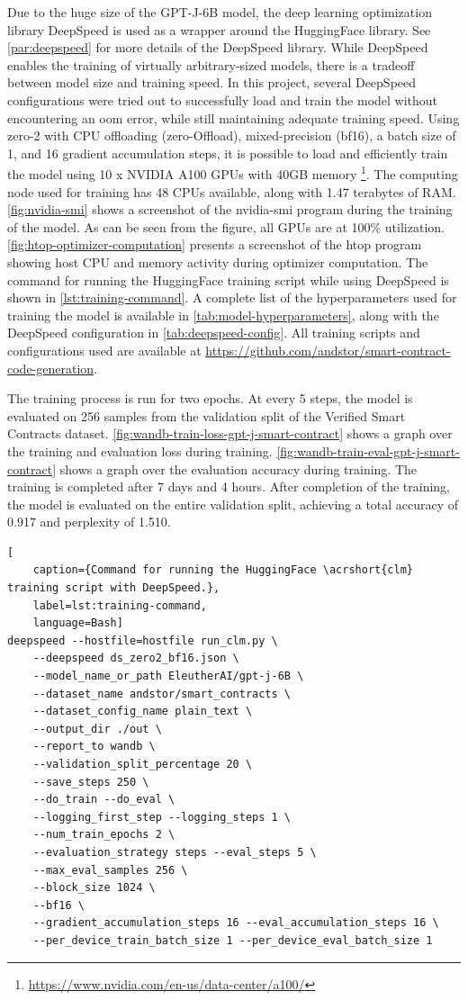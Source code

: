 Due to the huge size of the GPT-J-6B model, the deep learning optimization library DeepSpeed \cite{deepspeed} is used as a wrapper around the HuggingFace library. See \cref{par:deepspeed} for more details of the DeepSpeed library. While DeepSpeed enables the training of virtually arbitrary-sized models, there is a tradeoff between model size and training speed. In this project, several DeepSpeed configurations were tried out to successfully load and train the model without encountering an \acrfull{oom} error, while still maintaining adequate training speed. Using \acrshort{zero}-2 with CPU offloading (\acrshort{zero}-Offload), mixed-precision (\acrshort{bf16}), a batch size of 1, and 16 gradient accumulation steps, it is possible to load and efficiently train the model using 10 x NVIDIA A100 GPUs with 40GB memory \footnote{\url{https://www.nvidia.com/en-us/data-center/a100/}}. The computing node used for training has 48 CPUs available, along with 1.47 terabytes of RAM. \cref{fig:nvidia-smi} shows a screenshot of the nvidia-smi program during the training of the model. As can be seen from the figure, all GPUs are at 100\% utilization. \cref{fig:htop-optimizer-computation} presents a screenshot of the htop program showing host CPU and memory activity during optimizer computation. The command for running the HuggingFace training script while using DeepSpeed is shown in \cref{lst:training-command}. A complete list of the hyperparameters used for training the model is available in \cref{tab:model-hyperparameters}, along with the DeepSpeed configuration in \cref{tab:deepspeed-config}. All training scripts and configurations used are available at \url{https://github.com/andstor/smart-contract-code-generation}.

The training process is run for two epochs. At every 5 steps, the model is evaluated on 256 samples from the validation split of the Verified Smart Contracts dataset. \cref{fig:wandb-train-loss-gpt-j-smart-contract} shows a graph over the training and evaluation loss during training. \cref{fig:wandb-train-eval-gpt-j-smart-contract} shows a graph over the evaluation accuracy during training. The training is completed after 7 days and 4 hours. After completion of the training, the model is evaluated on the entire validation split, achieving a total accuracy of 0.917 and perplexity of 1.510.

\begin{lstlisting}[
    caption={Command for running the HuggingFace \acrshort{clm} training script with DeepSpeed.},
    label=lst:training-command,
    language=Bash]
deepspeed --hostfile=hostfile run_clm.py \
    --deepspeed ds_zero2_bf16.json \
    --model_name_or_path EleutherAI/gpt-j-6B \
    --dataset_name andstor/smart_contracts \
    --dataset_config_name plain_text \
    --output_dir ./out \
    --report_to wandb \
    --validation_split_percentage 20 \
    --save_steps 250 \
    --do_train --do_eval \
    --logging_first_step --logging_steps 1 \
    --num_train_epochs 2 \
    --evaluation_strategy steps --eval_steps 5 \
    --max_eval_samples 256 \
    --block_size 1024 \
    --bf16 \
    --gradient_accumulation_steps 16 --eval_accumulation_steps 16 \
    --per_device_train_batch_size 1 --per_device_eval_batch_size 1
\end{lstlisting}

